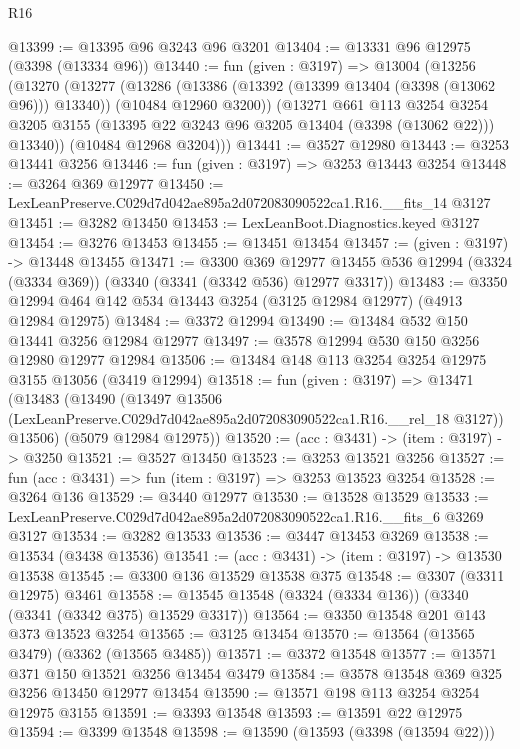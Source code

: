 \begin{lexlean}{R16}
\begin{coremodule}
@13399 := @13395 @96 @3243 @96 @3201
@13404 := @13331 @96 @12975 (@3398 (@13334 @96))
@13440 := fun (given : @3197) =>
  @13004
    (@13256
      (@13270
        (@13277
          (@13286
            (@13386 (@13392 (@13399 @13404 (@3398 (@13062 @96))) @13340))
            (@10484 @12960 @3200))
          (@13271
            @661
            @113
            @3254
            @3254
            @3205
            @3155
            (@13395 @22 @3243 @96 @3205 @13404 (@3398 (@13062 @22)))
            @13340))
        (@10484 @12968 @3204)))
@13441 := @3527 @12980
@13443 := @3253 @13441 @3256
@13446 := fun (given : @3197) => @3253 @13443 @3254
@13448 := @3264 @369 @12977
@13450 := LexLeanPreserve.C029d7d042ae895a2d072083090522ca1.R16.__fits_14 @3127
@13451 := @3282 @13450
@13453 := LexLeanBoot.Diagnostics.keyed @3127
@13454 := @3276 @13453
@13455 := @13451 @13454
@13457 := (given : @3197) -> @13448 @13455
@13471 := @3300
    @369
    @12977
    @13455
    @536
    @12994
    (@3324 (@3334 @369))
    (@3340 (@3341 (@3342 @536) @12977 @3317))
@13483 := @3350 @12994 @464 @142 @534 @13443 @3254 (@3125 @12984 @12977) (@4913 @12984 @12975)
@13484 := @3372 @12994
@13490 := @13484 @532 @150 @13441 @3256 @12984 @12977
@13497 := @3578 @12994 @530 @150 @3256 @12980 @12977 @12984
@13506 := @13484 @148 @113 @3254 @3254 @12975 @3155 @13056 (@3419 @12994)
@13518 := fun (given : @3197) =>
  @13471
    (@13483
      (@13490
        (@13497 @13506 (LexLeanPreserve.C029d7d042ae895a2d072083090522ca1.R16.__rel_18 @3127))
        @13506)
      (@5079 @12984 @12975))
@13520 := (acc : @3431) -> (item : @3197) -> @3250
@13521 := @3527 @13450
@13523 := @3253 @13521 @3256
@13527 := fun (acc : @3431) => fun (item : @3197) => @3253 @13523 @3254
@13528 := @3264 @136
@13529 := @3440 @12977
@13530 := @13528 @13529
@13533 := LexLeanPreserve.C029d7d042ae895a2d072083090522ca1.R16.__fits_6 @3269 @3127
@13534 := @3282 @13533
@13536 := @3447 @13453 @3269
@13538 := @13534 (@3438 @13536)
@13541 := (acc : @3431) -> (item : @3197) -> @13530 @13538
@13545 := @3300 @136 @13529 @13538 @375
@13548 := @3307 (@3311 @12975) @3461
@13558 := @13545 @13548 (@3324 (@3334 @136)) (@3340 (@3341 (@3342 @375) @13529 @3317))
@13564 := @3350 @13548 @201 @143 @373 @13523 @3254
@13565 := @3125 @13454
@13570 := @13564 (@13565 @3479) (@3362 (@13565 @3485))
@13571 := @3372 @13548
@13577 := @13571 @371 @150 @13521 @3256 @13454 @3479
@13584 := @3578 @13548 @369 @325 @3256 @13450 @12977 @13454
@13590 := @13571 @198 @113 @3254 @3254 @12975 @3155
@13591 := @3393 @13548
@13593 := @13591 @22 @12975
@13594 := @3399 @13548
@13598 := @13590 (@13593 (@3398 (@13594 @22)))

\end{coremodule}
\end{lexlean}
